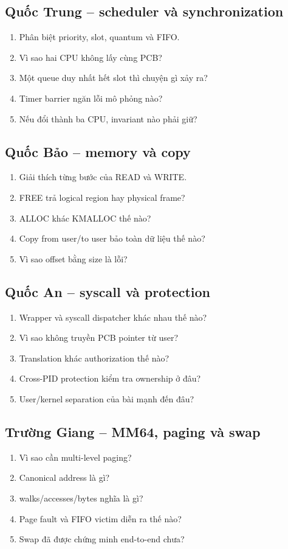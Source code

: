 \documentclass[11pt,a4paper]{article}
\begin{document}
\subsection{Quốc Trung -- scheduler và synchronization}
\begin{enumerate}
  \item Phân biệt priority, slot, quantum và FIFO.
  \item Vì sao hai CPU không lấy cùng PCB?
  \item Một queue duy nhất hết slot thì chuyện gì xảy ra?
  \item Timer barrier ngăn lỗi mô phỏng nào?
  \item Nếu đổi thành ba CPU, invariant nào phải giữ?
\end{enumerate}

\subsection{Quốc Bảo -- memory và copy}
\begin{enumerate}
  \item Giải thích từng bước của READ và WRITE.
  \item FREE trả logical region hay physical frame?
  \item ALLOC khác KMALLOC thế nào?
  \item Copy from user/to user bảo toàn dữ liệu thế nào?
  \item Vì sao offset bằng size là lỗi?
\end{enumerate}

\subsection{Quốc An -- syscall và protection}
\begin{enumerate}
  \item Wrapper và syscall dispatcher khác nhau thế nào?
  \item Vì sao không truyền PCB pointer từ user?
  \item Translation khác authorization thế nào?
  \item Cross-PID protection kiểm tra ownership ở đâu?
  \item User/kernel separation của bài mạnh đến đâu?
\end{enumerate}

\subsection{Trường Giang -- MM64, paging và swap}
\begin{enumerate}
  \item Vì sao cần multi-level paging?
  \item Canonical address là gì?
  \item walks/accesses/bytes nghĩa là gì?
  \item Page fault và FIFO victim diễn ra thế nào?
  \item Swap đã được chứng minh end-to-end chưa?
\end{enumerate}
\end{document}
